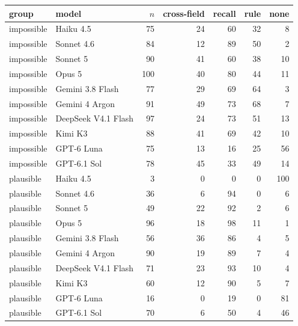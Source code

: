 \begin{tabular}{llrrrrr}
\toprule
group & model & $n$ & cross-field & recall & rule & none \\
\midrule
impossible & Haiku 4.5 & 75 & 24 & 60 & 32 & 8 \\
impossible & Sonnet 4.6 & 84 & 12 & 89 & 50 & 2 \\
impossible & Sonnet 5 & 90 & 41 & 60 & 38 & 10 \\
impossible & Opus 5 & 100 & 40 & 80 & 44 & 11 \\
impossible & Gemini 3.8 Flash & 77 & 29 & 69 & 64 & 3 \\
impossible & Gemini 4 Argon & 91 & 49 & 73 & 68 & 7 \\
impossible & DeepSeek V4.1 Flash & 97 & 24 & 73 & 51 & 13 \\
impossible & Kimi K3 & 88 & 41 & 69 & 42 & 10 \\
impossible & GPT-6 Luna & 75 & 13 & 16 & 25 & 56 \\
impossible & GPT-6.1 Sol & 78 & 45 & 33 & 49 & 14 \\
plausible & Haiku 4.5 & 3 & 0 & 0 & 0 & 100 \\
plausible & Sonnet 4.6 & 36 & 6 & 94 & 0 & 6 \\
plausible & Sonnet 5 & 49 & 22 & 92 & 2 & 6 \\
plausible & Opus 5 & 96 & 18 & 98 & 11 & 1 \\
plausible & Gemini 3.8 Flash & 56 & 36 & 86 & 4 & 5 \\
plausible & Gemini 4 Argon & 90 & 19 & 89 & 7 & 4 \\
plausible & DeepSeek V4.1 Flash & 71 & 23 & 93 & 10 & 4 \\
plausible & Kimi K3 & 60 & 12 & 90 & 5 & 7 \\
plausible & GPT-6 Luna & 16 & 0 & 19 & 0 & 81 \\
plausible & GPT-6.1 Sol & 70 & 6 & 50 & 4 & 46 \\
\bottomrule
\end{tabular}
